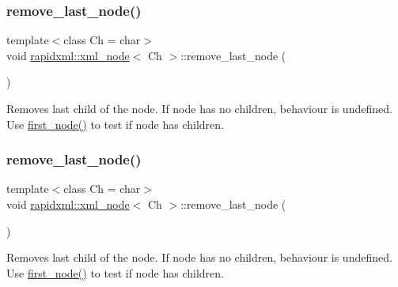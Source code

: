 \subsubsection{\texorpdfstring{remove\+\_\+last\+\_\+node()}{remove\_last\_node()}\hspace{0.1cm}{\footnotesize\ttfamily [1/2]}}
{\footnotesize\ttfamily template$<$class Ch = char$>$ \\
void \mbox{\hyperlink{classrapidxml_1_1xml__node}{rapidxml\+::xml\+\_\+node}}$<$ Ch $>$\+::remove\+\_\+last\+\_\+node (\begin{DoxyParamCaption}{ }\end{DoxyParamCaption})\hspace{0.3cm}{\ttfamily [inline]}}

Removes last child of the node. If node has no children, behaviour is undefined. Use \mbox{\hyperlink{classrapidxml_1_1xml__node_acdf3691224d683f50692616a92a75d3f}{first\+\_\+node()}} to test if node has children. \mbox{\label{classrapidxml_1_1xml__node_a9182512e948ec451a83f116cce7c7674}} 
\subsubsection{\texorpdfstring{remove\+\_\+last\+\_\+node()}{remove\_last\_node()}\hspace{0.1cm}{\footnotesize\ttfamily [2/2]}}
{\footnotesize\ttfamily template$<$class Ch = char$>$ \\
void \mbox{\hyperlink{classrapidxml_1_1xml__node}{rapidxml\+::xml\+\_\+node}}$<$ Ch $>$\+::remove\+\_\+last\+\_\+node (\begin{DoxyParamCaption}{ }\end{DoxyParamCaption})\hspace{0.3cm}{\ttfamily [inline]}}

Removes last child of the node. If node has no children, behaviour is undefined. Use \mbox{\hyperlink{classrapidxml_1_1xml__node_acdf3691224d683f50692616a92a75d3f}{first\+\_\+node()}} to test if node has children. \mbox{\label{classrapidxml_1_1xml__node_a98289923eb9e8889418a9eb0207ea35c}} 
